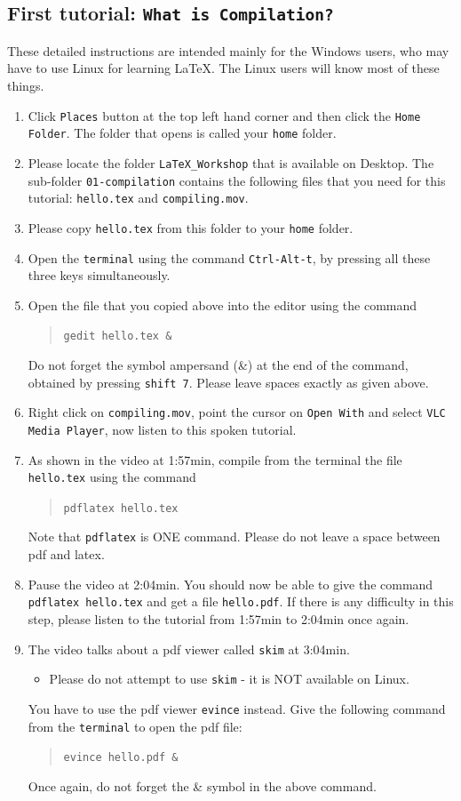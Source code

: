 \documentclass[11pt]{article}
\newenvironment{enumcpt}{\begin{enumerate} \topsep 0pt \partopsep 0pt 
                        \parsep 0pt
                        \itemsep 0pt \leftmargin -1in \rightmargin 0pt
                        }{\end{enumerate}}
\begin{document}
\begin{multicols}{2}
\section{First tutorial: {\tt What is
    Compilation?}}
These detailed instructions are intended mainly for the Windows users,
who may have to use Linux for learning \LaTeX.  The Linux users will
know most of these things.
\begin{enumcpt}
\item Click {\tt Places} button at
  the top left hand corner and then click the {\tt Home Folder}.  The
  folder that opens is called your {\tt home} folder.
\item Please locate the folder {\tt LaTeX\_Workshop} that is available
  on Desktop.  The sub-folder {\tt 01-compilation} contains the
  following files that you need for this tutorial: {\tt hello.tex} and
  {\tt compiling.mov}.
\item Please copy {\tt hello.tex} from this folder to your {\tt home}
  folder. 
\item Open the {\tt terminal} using the command {\tt Ctrl-Alt-t}, by
  pressing all these three keys simultaneously.
\item Open the file that you copied above into the editor using the
  command
\begin{quote}
  {\tt gedit hello.tex~\&}  
\end{quote}
Do not forget the symbol ampersand (\&) at the end of the command,
obtained by pressing {\tt shift 7}.  Please leave spaces exactly as
given above.
\item Right click on {\tt compiling.mov}, point the cursor on  {\tt Open With} and select {\tt VLC Media
    Player}, now listen to this spoken tutorial.
\item As shown in the video at 1:57min, compile from the terminal the
  file {\tt hello.tex} using the command  
\begin{quote}
  {\tt pdflatex hello.tex}
\end{quote}
Note that {\tt pdflatex} is ONE command.  Please do not leave a space
between pdf and latex.
\item Pause the video at 2:04min.  You should now be able to give the
  command {\tt pdflatex hello.tex} and get a file {\tt hello.pdf}.  If 
  there is any difficulty in this step, please listen to the tutorial
  from 1:57min to 2:04min once again.
\item The video talks about a pdf viewer called {\tt skim} at
  3:04min.  
\begin{itemize}
\item Please do not attempt to use {\tt skim} - it is NOT available on
Linux.
\end{itemize}
You have to use the pdf viewer {\tt evince} instead.  Give the
following command from the {\tt terminal} to open the pdf file:
\begin{quote}
  {\tt evince hello.pdf \&}
\end{quote}
Once again, do not forget the \& symbol in the above command.


\end{enumcpt}
\end{multicols}
\end{document}
